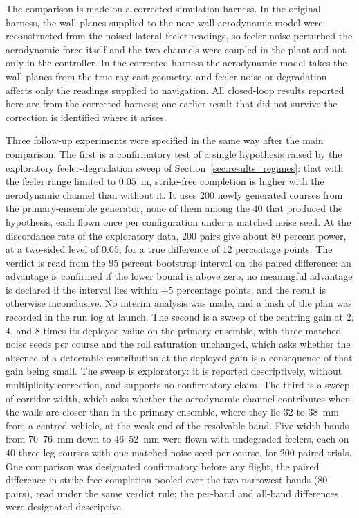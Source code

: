 \documentclass[final,5p,times]{elsarticle}
\begin{document}
The comparison is made on a corrected simulation harness. In the original harness, the wall planes supplied to the near-wall aerodynamic model were reconstructed from the noised lateral feeler readings, so feeler noise perturbed the aerodynamic force itself and the two channels were coupled in the plant and not only in the controller. In the corrected harness the aerodynamic model takes the wall planes from the true ray-cast geometry, and feeler noise or degradation affects only the readings supplied to navigation. All closed-loop results reported here are from the corrected harness; one earlier result that did not survive the correction is identified where it arises.

Three follow-up experiments were specified in the same way after the main comparison. The first is a confirmatory test of a single hypothesis raised by the exploratory feeler-degradation sweep of Section~\ref{sec:results_regimes}: that with the feeler range limited to $0.05$~m, strike-free completion is higher with the aerodynamic channel than without it. It uses $200$ newly generated courses from the primary-ensemble generator, none of them among the $40$ that produced the hypothesis, each flown once per configuration under a matched noise seed. At the discordance rate of the exploratory data, $200$ pairs give about $80$ percent power, at a two-sided level of $0.05$, for a true difference of $12$ percentage points. The verdict is read from the $95$ percent bootstrap interval on the paired difference: an advantage is confirmed if the lower bound is above zero, no meaningful advantage is declared if the interval lies within $\pm 5$ percentage points, and the result is otherwise inconclusive. No interim analysis was made, and a hash of the plan was recorded in the run log at launch. The second is a sweep of the centring gain at $2$, $4$, and $8$ times its deployed value on the primary ensemble, with three matched noise seeds per course and the roll saturation unchanged, which asks whether the absence of a detectable contribution at the deployed gain is a consequence of that gain being small. The sweep is exploratory: it is reported descriptively, without multiplicity correction, and supports no confirmatory claim. The third is a sweep of corridor width, which asks whether the aerodynamic channel contributes when the walls are closer than in the primary ensemble, where they lie $32$ to $38$~mm from a centred vehicle, at the weak end of the resolvable band. Five width bands from $70$--$76$~mm down to $46$--$52$~mm were flown with undegraded feelers, each on $40$ three-leg courses with one matched noise seed per course, for $200$ paired trials. One comparison was designated confirmatory before any flight, the paired difference in strike-free completion pooled over the two narrowest bands ($80$ pairs), read under the same verdict rule; the per-band and all-band differences were designated descriptive.
\end{document}
